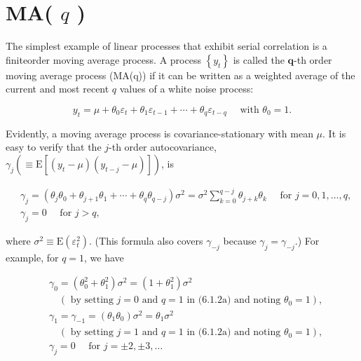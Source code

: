\documentclass[10pt]{article}
\begin{document}
\section*{MA( $q$ )}
The simplest example of linear processes that exhibit serial correlation is a finiteorder moving average process. A process $\left\{y_{t}\right\}$ is called the $\boldsymbol{q}$-th order moving average process (MA(q)) if it can be written as a weighted average of the current and most recent $q$ values of a white noise process:


\begin{equation*}
y_{t}=\mu+\theta_{0} \varepsilon_{t}+\theta_{1} \varepsilon_{t-1}+\cdots+\theta_{q} \varepsilon_{t-q} \quad \text { with } \theta_{0}=1 . \tag{6.1.1}
\end{equation*}


Evidently, a moving average process is covariance-stationary with mean $\mu$. It is easy to verify that the $j$-th order autocovariance, $\gamma_{j}\left(\equiv \mathrm{E}\left[\left(y_{t}-\mu\right)\left(y_{t-j}-\mu\right)\right]\right)$, is


\begin{align*}
& \gamma_{j}=\left(\theta_{j} \theta_{0}+\theta_{j+1} \theta_{1}+\cdots+\theta_{q} \theta_{q-j}\right) \sigma^{2}=\sigma^{2} \sum_{k=0}^{q-j} \theta_{j+k} \theta_{k} \quad \text { for } j=0,1, \ldots, q,  \tag{6.1.2a}\\
& \gamma_{j}=0 \quad \text { for } j>q, \tag{6.1.2b}
\end{align*}


where $\sigma^{2} \equiv \mathrm{E}\left(\varepsilon_{t}^{2}\right)$. (This formula also covers $\gamma_{-j}$ because $\gamma_{j}=\gamma_{-j}$.) For example, for $q=1$, we have

$$
\begin{aligned}
& \gamma_{0}=\left(\theta_{0}^{2}+\theta_{1}^{2}\right) \sigma^{2}=\left(1+\theta_{1}^{2}\right) \sigma^{2} \\
& \quad\left(\text { by setting } j=0 \text { and } q=1 \text { in (6.1.2a) and noting } \theta_{0}=1\right), \\
& \gamma_{1}=\gamma_{-1}=\left(\theta_{1} \theta_{0}\right) \sigma^{2}=\theta_{1} \sigma^{2} \\
& \quad\left(\text { by setting } j=1 \text { and } q=1 \text { in (6.1.2a) and noting } \theta_{0}=1\right), \\
& \gamma_{j}=0 \quad \text { for } j= \pm 2, \pm 3, \ldots
\end{aligned}
$$
\end{document}
